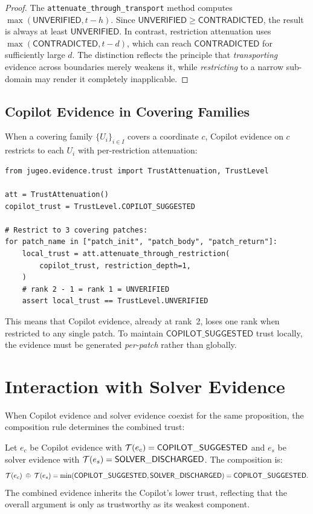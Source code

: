 \documentclass[11pt]{article}
\newcommand{\CopSugg}{\mathsf{COPILOT\_SUGGESTED}}
\newcommand{\SolDis}{\mathsf{SOLVER\_DISCHARGED}}
\newcommand{\Unver}{\mathsf{UNVERIFIED}}
\newcommand{\Contra}{\mathsf{CONTRADICTED}}
\begin{document}
\begin{proof}
The \texttt{attenuate\_through\_transport} method computes
$\max(\Unver, t - h)$.  Since $\Unver \geq \Contra$, the result is always
at least $\Unver$.  In contrast, restriction attenuation uses
$\max(\Contra, t - d)$, which can reach $\Contra$ for sufficiently large $d$.
The distinction reflects the principle that \emph{transporting} evidence
across boundaries merely weakens it, while \emph{restricting} to a narrow
sub-domain may render it completely inapplicable.
\end{proof}

\subsection{Copilot Evidence in Covering Families}

When a covering family $\{U_i\}_{i \in I}$ covers a coordinate $c$, Copilot
evidence on $c$ restricts to each $U_i$ with per-restriction attenuation:

\begin{lstlisting}[style=jugeo-python]
from jugeo.evidence.trust import TrustAttenuation, TrustLevel

att = TrustAttenuation()
copilot_trust = TrustLevel.COPILOT_SUGGESTED

# Restrict to 3 covering patches:
for patch_name in ["patch_init", "patch_body", "patch_return"]:
    local_trust = att.attenuate_through_restriction(
        copilot_trust, restriction_depth=1,
    )
    # rank 2 - 1 = rank 1 = UNVERIFIED
    assert local_trust == TrustLevel.UNVERIFIED
\end{lstlisting}

This means that Copilot evidence, already at rank~2, loses one rank when
restricted to any single patch.  To maintain $\CopSugg$ trust locally, the
evidence must be generated \emph{per-patch} rather than globally.

\section{Interaction with Solver Evidence}\label{sec:solver-interaction}

When Copilot evidence and solver evidence coexist for the same proposition,
the composition rule determines the combined trust:

\begin{example}\label{ex:copilot-solver}
Let $e_c$ be Copilot evidence with $\trust(e_c) = \CopSugg$ and $e_s$ be
solver evidence with $\trust(e_s) = \SolDis$.  The composition is:
\[
  \trust(e_c) \;\tjoin\; \trust(e_s) = \min(\CopSugg, \SolDis) = \CopSugg.
\]
The combined evidence inherits the Copilot's lower trust, reflecting that the
overall argument is only as trustworthy as its weakest component.
\end{example}
\end{document}
